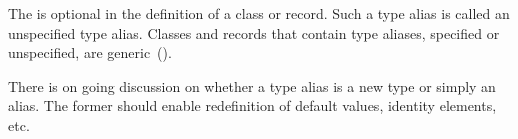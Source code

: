 The  is optional in the definition of a class or
record.  Such a type alias is called an unspecified type
alias. Classes and records that contain type aliases, specified or
unspecified, are generic~().

\begin{openissue}
There is on going discussion on whether a type alias is a new
type or simply an alias.  The former should enable redefinition of
default values, identity elements, etc.
\end{openissue}
